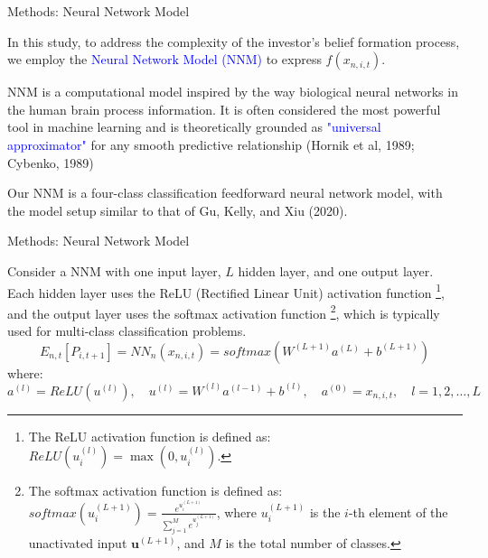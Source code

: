 \documentclass[11pt, aspectratio=169]{beamer}
\newenvironment{wideitemize}{\itemize\addtolength{\itemsep}{10pt}}{\enditemize}
\begin{document}
\begin{frame}{Methods: Neural Network Model}
    \bigskip
    \begin{wideitemize}
    \item In this study, to address the complexity of the investor's belief formation process, we employ the \textcolor{blue}{Neural Network Model (NNM)} to express $f(x_{n,i,t})$.
    \item NNM is a computational model inspired by the way \alert{biological neural networks} in the human brain process information. It is often considered the most powerful tool in machine learning and is theoretically grounded as \textcolor{blue}{"universal approximator"} for any smooth predictive relationship (Hornik et al, 1989; Cybenko, 1989)
    \item Our NNM is a \alert{four-class classification feedforward neural network model}, with the model setup similar to that of Gu, Kelly, and Xiu (2020). 
    \end{wideitemize}
\end{frame}

\begin{frame}{Methods: Neural Network Model}
    \bigskip
    \begin{wideitemize}
    \item Consider a NNM with one input layer, $L$ hidden layer, and one output layer. Each hidden layer uses the \alert{ReLU} (Rectified Linear Unit) activation function \footnote{The ReLU activation function is defined as: $ReLU(u^{(l)}_i)=\max(0,u^{(l)}_i)$.}, and the output layer uses the \alert{softmax} activation function \footnote{The softmax activation function is defined as: $softmax(u^{(L+1)}_i)=\frac{e^{u^{(L+1)}_i}}{\sum_{j=1}^Me^{u^{(L+1)}_j}}$, where $u^{(L+1)}_i$ is the $i$-th element of the unactivated input $\mathbf{u}^{(L+1)}$, and $M$ is the total number of classes.}, which is typically used for multi-class classification problems.
    \begin{equation*}
E_{n,t}[P_{i,t+1}]=NN_{n}\left(x_{n,i,t}\right)=softmax\left(W^{(L+1)}a^{(L)}+b^{(L+1)}\right) \label{nn}
    \end{equation*}
    where:$$a^{(l)}=ReLU(u^{(l)}),\quad u^{(l)}=W^{(l)}a^{(l-1)}+b^{(l)},\quad a^{(0)}={x_{n,i,t}},\quad l=1,2,\ldots,L$$
    \end{wideitemize}
\end{frame}
\end{document}
